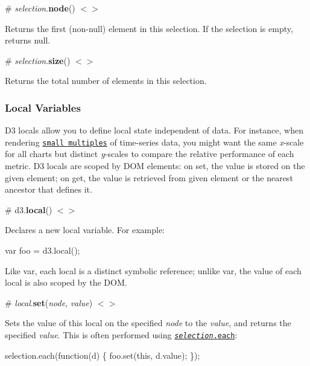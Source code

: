 \label{_selection_node}%
\# {\itshape selection}.{\bfseries node}() \href{https://github.com/d3/d3-selection/blob/master/src/selection/node.js}{\tt $<$$>$}

Returns the first (non-\/null) element in this selection. If the selection is empty, returns null.

\label{_selection_size}%
\# {\itshape selection}.{\bfseries size}() \href{https://github.com/d3/d3-selection/blob/master/src/selection/size.js}{\tt $<$$>$}

Returns the total number of elements in this selection.

\subsubsection*{Local Variables}

D3 locals allow you to define local state independent of data. For instance, when rendering \href{http://bl.ocks.org/mbostock/e1192fe405703d8321a5187350910e08}{\tt small multiples} of time-\/series data, you might want the same {\itshape x}-\/scale for all charts but distinct {\itshape y}-\/scales to compare the relative performance of each metric. D3 locals are scoped by D\+OM elements\+: on set, the value is stored on the given element; on get, the value is retrieved from given element or the nearest ancestor that defines it.

\label{_local}%
\# d3.{\bfseries local}() \href{https://github.com/d3/d3-selection/blob/master/src/local.js}{\tt $<$$>$}

Declares a new local variable. For example\+:


\begin{DoxyCode}
var foo = d3.local();
\end{DoxyCode}


Like {\ttfamily var}, each local is a distinct symbolic reference; unlike {\ttfamily var}, the value of each local is also scoped by the D\+OM.

\label{_local_set}%
\# {\itshape local}.{\bfseries set}({\itshape node}, {\itshape value}) \href{https://github.com/d3/d3-selection/blob/master/src/local.js#L18}{\tt $<$$>$}

Sets the value of this local on the specified {\itshape node} to the {\itshape value}, and returns the specified {\itshape value}. This is often performed using \href{#selection_each}{\tt {\itshape selection}.each}\+:


\begin{DoxyCode}
selection.each(function(d) \{ foo.set(this, d.value); \});
\end{DoxyCode}


